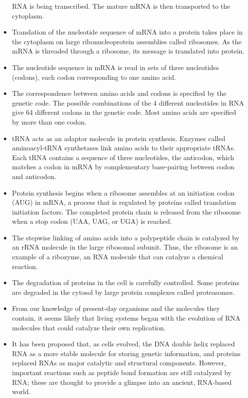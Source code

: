\begin{itemize}
RNA is being transcribed. The mature mRNA is then transported to
the cytoplasm.
\item Translation of the nucleotide sequence of mRNA into a protein takes
place in the cytoplasm on large ribonucleoprotein assemblies called
ribosomes. As the mRNA is threaded through a ribosome, its message
is translated into protein.
\item The nucleotide sequence in mRNA is read in sets of three nucleotides
(codons), each codon corresponding to one amino acid.
\item The correspondence between amino acids and codons is specified
by the genetic code. The possible combinations of the 4 different
nucleotides in RNA give 64 different codons in the genetic code. Most
amino acids are specified by more than one codon.
\item tRNA acts as an adaptor molecule in protein synthesis. Enzymes
called aminoacyl-tRNA synthetases link amino acids to their appropriate
tRNAs. Each tRNA contains a sequence of three nucleotides,
the anticodon, which matches a codon in mRNA by complementary
base-pairing between codon and anticodon.
\item Protein synthesis begins when a ribosome assembles at an initiation
codon (AUG) in mRNA, a process that is regulated by proteins
called translation initiation factors. The completed protein chain is
released from the ribosome when a stop codon (UAA, UAG, or UGA)
is reached.
\item The stepwise linking of amino acids into a polypeptide chain is catalyzed
by an rRNA molecule in the large ribosomal subunit. Thus, the
ribosome is an example of a ribozyme, an RNA molecule that can
catalyze a chemical reaction.
\item The degradation of proteins in the cell is carefully controlled. Some
proteins are degraded in the cytosol by large protein complexes
called proteasomes.
\item From our knowledge of present-day organisms and the molecules
they contain, it seems likely that living systems began with the evolution
of RNA molecules that could catalyze their own replication.
\item It has been proposed that, as cells evolved, the DNA double helix
replaced RNA as a more stable molecule for storing genetic information,
and proteins replaced RNAs as major catalytic and structural
components. However, important reactions such as peptide bond
formation are still catalyzed by RNA; these are thought to provide a
glimpse into an ancient, RNA-based world.
\end{itemize}

